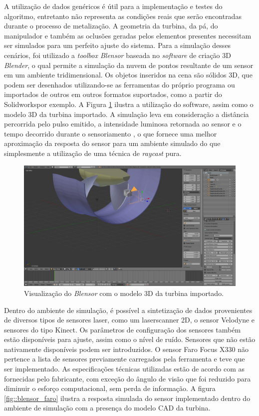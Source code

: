 A utilização de dados genéricos é útil para a implementação e testes do
algoritmo, entretanto não representa as condições reais que serão encontradas
durante o processo de metalização. A geometria da turbina, da pá, do manipulador
e também as oclusões geradas pelos elementos presentes necessitam ser simulados
para um perfeito ajuste do sistema. Para a simulação desses cenários, foi
utilizado a \textit{toolbox Blensor}\footnotemark
{} baseada no \textit{software} de criação 3D
\textit{Blender}\footnotemark {}, o qual
permite a simulação da nuvem de pontos resultante de um sensor em um ambiente
tridimensional. Os objetos inseridos na cena são sólidos 3D, que podem ser
desenhados utilizando-se as ferramentas do próprio programa ou importados de
outros  em outros formatos suportados, como a partir do
Solidworks\textregistered por exemplo. A Figura \ref{fig::blensor_screen}
ilustra a utilização do software, assim como o modelo 3D da turbina importado. A
simulação leva em consideração a distância percorrida pelo pulso emitido, a
intensidade luminosa retornada ao sensor e o tempo decorrido durante o
sensoriamento \cite{Gschwandtner2011}, o que fornece uma melhor aproximação da
resposta do sensor para um ambiente simulado do que simplesmente a utilização de
uma técnica de \textit{raycast} pura.

\begin{figure}[h!]
	\centering
	\includegraphics[width=0.9\columnwidth]{figs/calibracao/blensor_screen}
	\caption{Visualização do \textit{Blensor} com o modelo 3D da turbina
	importado.}
    \label{fig::blensor_screen}
\end{figure}

Dentro do ambiente de simulação, é possível a sintetização de dados provenientes
de diversos tipos de sensores laser, como um laserscanner 2D, o sensor
Velodyne e sensores do tipo Kinect. Os parâmetros de configuração
dos sensores também estão disponíveis para ajuste, assim como o nível de ruído. Sensores que não estão
nativamente disponíveis podem ser introduzidos. O sensor Faro Focus X330 não
pertence a lista de sensores previamente carregados pela ferramenta e teve que
ser implementado. As especificações técnicas utilizadas estão de acordo com as
fornecidas pelo fabricante, com exceção do ângulo de visão que foi reduzido para
diminuir o esforço computacional, sem perda de informação. A figura
\ref{fig::blensor_faro} ilustra a resposta simulada do sensor implementado
dentro do ambiente de simulação com a presença do modelo CAD da turbina.



